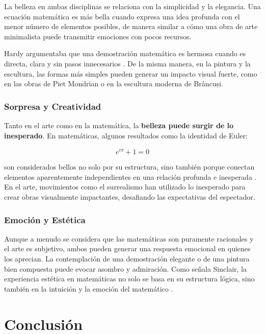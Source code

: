 \documentclass[twocolumn]{article}
\begin{document}
La belleza en ambas disciplinas se relaciona con la simplicidad y la elegancia. Una ecuación matemática es más bella cuando expresa una idea profunda con el menor número de elementos posibles, de manera similar a cómo una obra de arte minimalista puede transmitir emociones con pocos recursos. 

Hardy argumentaba que una demostración matemática es hermosa cuando es directa, clara y sin pasos innecesarios \cite{hardy1940}. De la misma manera, en la pintura y la escultura, las formas más simples pueden generar un impacto visual fuerte, como en las obras de Piet Mondrian o en la escultura moderna de Brâncuși.

\subsubsection{Sorpresa y Creatividad}

Tanto en el arte como en la matemática, la \textbf{belleza puede surgir de lo inesperado}. En matemáticas, algunos resultados como la identidad de Euler:

\begin{equation}
    e^{i\pi} + 1 = 0
\end{equation}

son considerados bellos no solo por su estructura, sino también porque conectan elementos aparentemente independientes en una relación profunda e inesperada \cite{francis2015}. En el arte, movimientos como el surrealismo han utilizado lo inesperado para crear obras visualmente impactantes, desafiando las expectativas del espectador.

\subsubsection{Emoción y Estética}

Aunque a menudo se considera que las matemáticas son puramente racionales y el arte es subjetivo, ambos pueden generar una respuesta emocional en quienes los aprecian. La contemplación de una demostración elegante o de una pintura bien compuesta puede evocar asombro y admiración. Como señala Sinclair, la experiencia estética en matemáticas no solo se basa en su estructura lógica, sino también en la intuición y la emoción del matemático \cite{sinclair2006}.

\section*{Conclusión}
\end{document}
